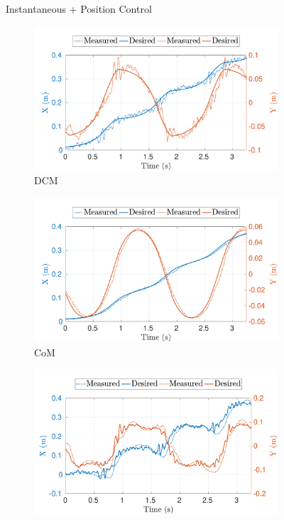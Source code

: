 \begin{figure}[t]
    \centering
    \begin{myframe}{Instantaneous + Position Control}
        \centering
    \begin{subfigure}[b]{0.49\textwidth}
        \centering
        \includegraphics[width=\textwidth]{chapter_simplified_benchmarking/figures/inst_pos-min_vel-dcm.pdf}
        \caption{DCM}
        \label{fig:inst_pos-min_vel-dcm}
    \end{subfigure}
    \hfill
    \begin{subfigure}[b]{0.49\textwidth}
        \centering
        \includegraphics[width=\textwidth]{chapter_simplified_benchmarking/figures/inst_pos-min_vel-com.pdf}
        \caption{CoM}
        \label{fig:inst_pos-min_vel-com}
    \end{subfigure}
    \hfill
    \begin{subfigure}[b]{0.49\textwidth}
        \centering
        \includegraphics[width=\textwidth]{chapter_simplified_benchmarking/figures/inst_pos-min_vel-zmp.pdf}

\end{subfigure}
\end{myframe}
\end{figure}
